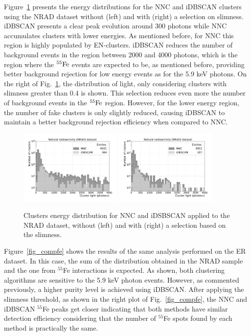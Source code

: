 \documentclass[a4paper,11pt]{article}
\begin{document}
Figure~\ref{fig_compcosmic} presents the energy distributions for the NNC and iDBSCAN clusters using the NRAD dataset without (left) and with (right) a selection on slimness.
iDBSCAN presents a clear peak evolution around 300 photons while NNC accumulates clusters with lower energies. As mentioned before, for NNC this region is highly populated by EN-clusters.
iDBSCAN reduces the number of background events in the region between 2000 and 4000 photons, which is the region where the $\rm ^{55}Fe$ events are expected to be, as mentioned before, providing better background rejection for low energy events as for the 5.9 keV photons.
On the right of Fig.~\ref{fig_compcosmic}, the distribution of light, only considering clusters with slimness greater than 0.4 is shown. This selection reduces even more the number of background events in the $\rm ^{55}Fe$ region. 
However, for the lower energy region, the number of fake clusters is only slightly reduced, causing iDBSCAN to maintain a better background rejection efficiency when compared to NNC.


\begin{figure}[ht]
\centering
\includegraphics[width=0.45\textwidth]{LigthYield_Cos_wo.pdf}
\includegraphics[width=0.45\textwidth]{LigthYield_Cos_Slim.pdf}
\caption{Clusters energy distribution for NNC and iDSBSCAN applied to the NRAD dataset, without (left) and with (right) a selection based on the slimness.}
\label{fig_compcosmic}
\end{figure}

Figure~\ref{fig_compfe} shows the results of the same analysis performed on the ER dataset. In this case, the  sum of the distribution obtained in the NRAD sample and the one from $^{55}$Fe interactions is expected. As shown, both clustering algorithms are sensitive to the 5.9 keV photon events. However, as commented previously, a higher purity level is achieved using iDBSCAN.
After applying the slimness threshold, as shown in the right plot of Fig.~\ref{fig_compfe}, the NNC and iDBSCAN  $^{55}$Fe peaks get closer indicating that both methods have similar detection efficiency considering that the number of $^{55}$Fe spots found by each method is practically the same.  
\end{document}
